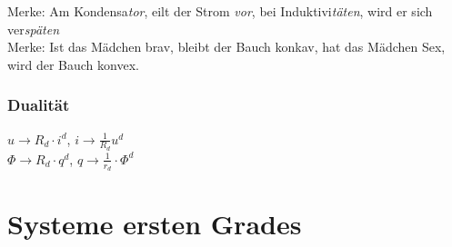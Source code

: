 \documentclass[fs, footer]{latex4ei}
\begin{document}
\begin{multicols*}{4}
Merke: Am Kondensa\textsl{tor}, eilt der Strom \textsl{vor}, bei Induktivi\textsl{täten}, wird er sich ver\textsl{späten}\\
Merke: Ist das Mädchen brav, bleibt der Bauch konkav, hat das Mädchen Sex, wird der Bauch konvex.\\

\subsubsection{Dualität}
$u\rightarrow R_d\cdot i^d$, $i\rightarrow \frac{1}{R_d}u^d$\\
$\Phi\rightarrow R_d\cdot q^d$, $q\rightarrow \frac{1}{r_d}\cdot\Phi^d$ 


\section{Systeme ersten Grades}
\end{multicols*}
\end{document}
